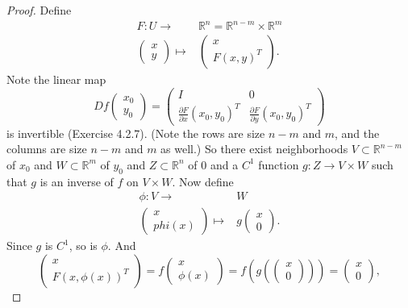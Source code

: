 \documentclass[12pt]{article}
\begin{document}
\begin{proof} 
	Define 
	\begin{align*}
		F: U\to& \mathbb{R}^n=\mathbb{R}^{n-m}\times\mathbb{R}^m  \\
		\begin{pmatrix} x \\ y \end{pmatrix} \mapsto& \begin{pmatrix} x \\ F(x,y)^T \end{pmatrix}.
	\end{align*}
	Note the linear map 
	\begin{equation*}
		Df\begin{pmatrix}x_0 \\ y_0\end{pmatrix} = \begin{pmatrix} I & 0 \\ \frac{\partial F}{\partial x}(x_0,y_0)^T & \frac{\partial F}{\partial y}(x_0, y_0)^T \end{pmatrix}
	\end{equation*}
	is invertible (Exercise 4.2.7). (Note the rows are size $n-m$ and $m$, and the columns are size $n-m$ and $m$ as well.) So there exist neighborhoods $V\subset\mathbb{R}^{n-m}$ of $x_0$ and $W\subset\mathbb{R}^m$ of $y_0$ and $Z\subset\mathbb{R}^n$ of $0$ and a $C^1$ function $g:Z\to V\times W$ such that $g$ is an inverse of $f$ on $V\times W$. Now define 
	\begin{align*}
		\phi:V\to& W \\
		\begin{pmatrix} x\\ phi(x) \end{pmatrix} \mapsto& g\begin{pmatrix}x\\ 0\end{pmatrix}.
	\end{align*}
	Since $g$ is $C^1$, so is $\phi$. And 
	\begin{equation*}
		\begin{pmatrix}x \\ F(x,\phi(x))^T \end{pmatrix} = f\begin{pmatrix}x\\ \phi(x)\end{pmatrix} = f(g(\begin{pmatrix}x\\ 0\end{pmatrix})) = \begin{pmatrix}x\\ 0\end{pmatrix},

\end{equation*}
\end{proof}
\end{document}
